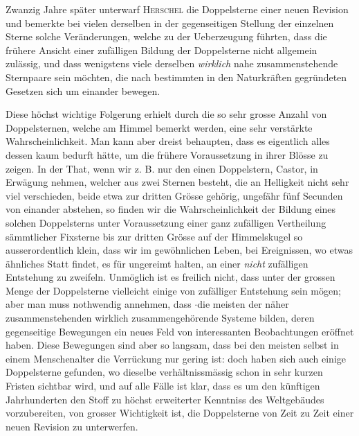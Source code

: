 Zwanzig Jahre später unterwarf \textsc{Herschel} die Doppelsterne einer neuen Revision und bemerkte bei vielen derselben in der gegenseitigen Stellung der einzelnen Sterne solche Veränderungen, welche zu der Ueberzeugung führten, dass die frühere Ansicht einer zufälligen Bildung der Doppelsterne nicht allgemein zulässig, und dass wenigstens viele derselben \emph{wirklich} nahe zusammenstehende Sternpaare sein möchten, die nach bestimmten in den Naturkräften gegründeten Gesetzen sich um einander bewegen.

Diese höchst wichtige Folgerung erhielt durch die so sehr grosse Anzahl von Doppelsternen, welche am Himmel bemerkt werden, eine sehr verstärkte Wahrscheinlichkeit. Man kann aber dreist behaupten, dass es eigentlich alles dessen kaum bedurft hätte, um die frühere Voraussetzung in ihrer Blösse zu zeigen. In der That, wenn wir z. B. nur den einen Doppelstern, Castor, in Erwägung nehmen, welcher aus zwei Sternen besteht, die an Helligkeit nicht sehr viel verschieden, beide etwa zur dritten Grösse gehörig, ungefähr fünf Secunden von einander abstehen, so finden wir die Wahrscheinlichkeit der Bildung eines solchen Doppelsterns unter Voraussetzung einer ganz zufälligen Vertheilung sämmtlicher Fixsterne bis zur dritten Grösse auf der Himmelskugel so ausserordentlich klein, dass wir im gewöhnlichen Leben, bei Ereignissen, wo etwas ähnliches Statt findet, es für ungereimt halten, an einer \emph{nicht} zufälligen Entstehung zu zweifeln. Unmöglich ist es freilich nicht, dass unter der grossen Menge der Doppelsterne vielleicht einige von zufälliger Entstehung sein mögen; aber man muss nothwendig annehmen, dass $\cdot$die meisten der näher zusammenstehenden wirklich zusammengehörende Systeme bilden, deren gegenseitige Bewegungen ein neues Feld von interessanten Beobachtungen eröffnet haben. Diese Bewegungen sind aber so langsam, dass bei den meisten selbst in einem Menschenalter die Verrückung nur gering ist: doch haben sich auch einige Doppelsterne gefunden, wo dieselbe verhältnissmässig schon in sehr kurzen Fristen sichtbar wird, und auf alle Fälle ist klar, dass es um den künftigen Jahrhunderten den Stoff zu höchst erweiterter Kenntniss des Weltgebäudes vorzubereiten, von grosser Wichtigkeit ist, die Doppelsterne von Zeit zu Zeit einer neuen Revision zu unterwerfen.

